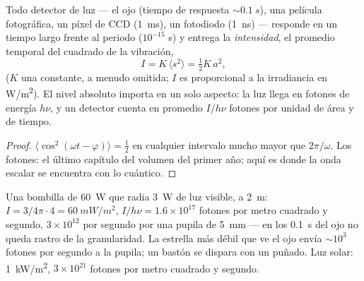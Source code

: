 \begin{proposition}\label{prop:b2:scalar-light-model:intensity}
Todo detector de luz --- el ojo (tiempo de respuesta $\sim\qty{0.1}{s}$), una
película fotográfica, un píxel de CCD (\qty{1}{ms}), un fotodiodo (\qty{1}{ns}) ---
responde en un tiempo largo frente al periodo ($10^{-15}$ s) y
entrega la \emph{intensidad}, el promedio temporal del cuadrado de la
vibración,
\[
I = K\,\langle s^2\rangle = \tfrac12K\,a^2 ,
\]
($K$ una constante, a menudo omitida; $I$ es proporcional a la irradiancia
en \unit{W/m^2}). El nivel absoluto importa en un solo aspecto: la luz
llega en fotones de energía $h\nu$, y un detector cuenta en promedio
$I/h\nu$ fotones por unidad de área y de tiempo.
\end{proposition}

\begin{proof}
$\langle\cos^2(\omega t - \varphi)\rangle = \tfrac12$ en cualquier intervalo mucho mayor
que $2\pi/\omega$. Los fotones: el último capítulo del volumen del primer año; aquí es
donde la onda escalar se encuentra con lo cuántico.
\end{proof}

\begin{example}\label{ex:b2:scalar-light-model:orders}
Una bombilla de \qty{60}{W} que radia \qty{3}{W} de luz visible, a \qty{2}{m}:
$I = 3/4\pi\cdot4 = \qty{60}{mW/m^2}$, $I/h\nu = 1.6 \times 10^{17}$ fotones por metro
cuadrado y segundo, $3 \times 10^{12}$ por segundo por una pupila de \qty{5}{mm} ---
en los \qty{0.1}{s} del ojo no queda rastro de la granularidad. La
estrella más débil que ve el ojo envía $\sim 10^3$ fotones por segundo a la
pupila; un bastón se dispara con un puñado. Luz solar: \qty{1}{kW/m^2}, $3 \times 10^{21}$
fotones por metro cuadrado y segundo.
\end{example}

